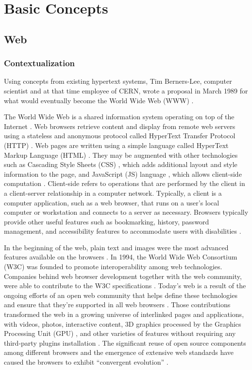 \chapter{Basic Concepts} %
\label{cha:basic_concepts}

\section{Web} %
\label{sec:basic_concepts:web}

\subsection{Contextualization} %
\label{sub:basic_concepts:web:contextualization}

Using concepts from existing hypertext systems, Tim Berners-Lee, computer scientist and at that time employee of CERN, wrote a proposal in March 1989 for what would eventually become the World Wide Web (WWW) \cite{WC2006}.

The World Wide Web is a shared information system operating on top of the Internet \cite{WC2006}. Web browsers retrieve content and display from remote web servers using a stateless and anonymous protocol called HyperText Transfer Protocol (HTTP) \cite{WC2006}. Web pages are written using a simple language called HyperText Markup Language (HTML) \cite{WC2006}. They may be augmented with other technologies such as Cascading Style Sheets (CSS) \cite{CSS2013}, which adds additional layout and style information to the page, and JavaScript (JS) language \cite{International2009}, which allows client-side computation \cite{WC2006}. Client-side refers to operations that are performed by the client in a client-server relationship in a computer network. Typically, a client is a computer application, such as a web browser, that runs on a user's local computer or workstation and connects to a server as necessary. Browsers typically provide other useful features such as bookmarking, history, password management, and accessibility features to accommodate users with disabilities \cite{Grosskurth2005}.

In the beginning of the web, plain text and images were the most advanced features available on the browsers \cite{WC2006}. In 1994, the World Wide Web Consortium (W3C) was founded to promote interoperability among web technologies. Companies behind web browser development together with the web community, were able to contribute to the W3C specifications \cite{WC2006}. Today's web is a result of the ongoing efforts of an open web community that helps define these technologies and ensure that they're supported in all web browsers \cite{Grosskurth2005}. Those contributions transformed the web in a growing universe of interlinked pages and applications, with videos, photos, interactive content, 3D graphics processed by the Graphics Processing Unit (GPU) \cite{WebGL2013}, and other varieties of features without requiring any third-party plugins installation \cite{Hickson2013}. The significant reuse of open source components among different browsers and the emergence of extensive web standards have caused the browsers to exhibit ``convergent evolution'' \cite{Grosskurth2005}.

